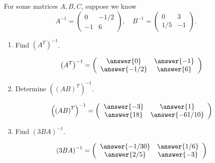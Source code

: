 \documentclass{ximera}
\author{Parisa Fatheddin}
\begin{document}
\begin{exercise}
  For some matrices $A, B, C$, suppose we know
  \[
    A^{-1} = \left(
      \begin{array}{ccc}
        0 & -1/2 \\
        -1 & 6
      \end{array}
    \right), \quad
    B^{-1} =
    \left(
      \begin{array}{ccc}
        0 & 3  \\
        1/5 & -1
      \end{array}
    \right).
  \]

  \begin{enumerate}
  \item Find $\left(A^{T}\right)^{-1}$.
    \begin{prompt}
      \[
        \left(A^{T}\right)^{-1} = \left(
          \begin{array}{cc}
            \answer{0} & \answer{-1}\\
            \answer{-1/2} & \answer{6}
          \end{array}
        \right)
      \]
    \end{prompt}
  \item Determine $\left((AB)^{T}\right)^{-1}$.
    \begin{prompt}
      \[
        \left(\left(AB\right)^{T}\right)^{-1} = \left(
          \begin{array}{cc}
            \answer{-3} & \answer{1}\\
            \answer{18} & \answer{-61/10}
          \end{array}
        \right)
      \]
    \end{prompt}
  \item Find $\left(3BA\right)^{-1}$.
    \begin{prompt}
      \[
        \left(3BA\right)^{-1}= \left(
          \begin{array}{cc}
            \answer{-1/30} & \answer{1/6}\\
            \answer{2/5} & \answer{-3}
          \end{array}
        \right)
      \]
    \end{prompt}
  \end{enumerate}

\end{exercise}
\end{document}
